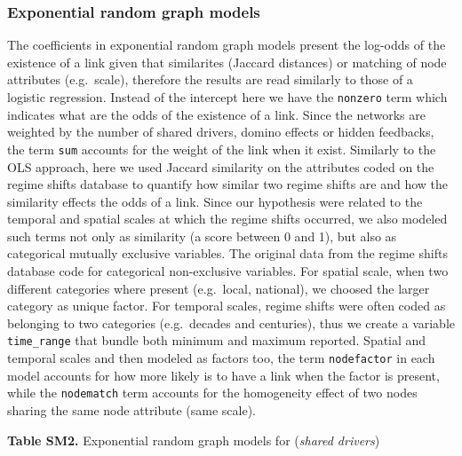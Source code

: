 \documentclass[9pt,]{article}
\begin{document}
\endgroup 

\subsubsection{Exponential random graph
models}\label{exponential-random-graph-models}

The coefficients in exponential random graph models present the log-odds
of the existence of a link given that similarites (Jaccard distances) or
matching of node attributes (e.g.~scale), therefore the results are read
similarly to those of a logistic regression. Instead of the intercept
here we have the \texttt{nonzero} term which indicates what are the odds
of the existence of a link. Since the networks are weighted by the
number of shared drivers, domino effects or hidden feedbacks, the term
\texttt{sum} accounts for the weight of the link when it exist.
Similarly to the OLS approach, here we used Jaccard similarity on the
attributes coded on the regime shifts database to quantify how similar
two regime shifts are and how the similarity effects the odds of a link.
Since our hypothesis were related to the temporal and spatial scales at
which the regime shifts occurred, we also modeled such terms not only as
similarity (a score between 0 and 1), but also as categorical mutually
exclusive variables. The original data from the regime shifts database
code for categorical non-exclusive variables. For spatial scale, when
two different categories where present (e.g.~local, national), we
choosed the larger category as unique factor. For temporal scales,
regime shifts were often coded as belonging to two categories
(e.g.~decades and centuries), thus we create a variable
\texttt{time\_range} that bundle both minimum and maximum reported.
Spatial and temporal scales and then modeled as factors too, the term
\texttt{nodefactor} in each model accounts for how more likely is to
have a link when the factor is present, while the \texttt{nodematch}
term accounts for the homogeneity effect of two nodes sharing the same
node attribute (same scale).

\textbf{Table SM2.} Exponential random graph models for
(\textit{shared drivers})

\begingroup
\footnotesize
\end{document}

